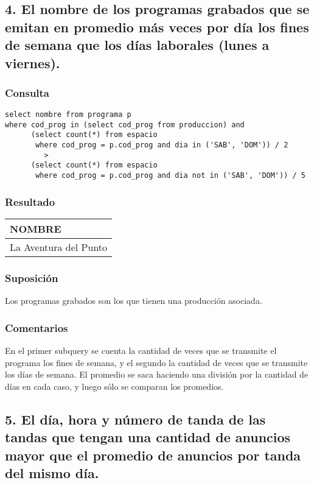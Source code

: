 \subsection*{4. \normalsize{El nombre de los programas grabados que se emitan en promedio m\'as veces por d\'ia los fines de semana que los d\'ias laborales (lunes a viernes).}}

\subsubsection*{Consulta}
\begin{lstlisting} 
select nombre from programa p
where cod_prog in (select cod_prog from produccion) and
      (select count(*) from espacio
       where cod_prog = p.cod_prog and dia in ('SAB', 'DOM')) / 2 
         >
      (select count(*) from espacio
       where cod_prog = p.cod_prog and dia not in ('SAB', 'DOM')) / 5
\end{lstlisting}

\subsubsection*{Resultado}
\begin{tabular}{|l|}
  \hline
    \bf{NOMBRE} \\ 
  \hline
    La Aventura del Punto \\ 
  \hline
\end{tabular} 


\subsubsection*{Suposici\'on}
Los programas grabados son los que tienen una producci\'on asociada. \\

\subsubsection*{Comentarios}
En el primer subquery se cuenta la cantidad de veces que se transmite el programa los fines de semana, y el segundo la cantidad de veces que se transmite los d\'ias de semana. El promedio se saca haciendo una divisi\'on por la cantidad de d\'ias en cada caso, y luego s\'olo se comparan los promedios.


\subsection*{5. \normalsize{El d\'ia, hora y n\'umero de tanda de las tandas que tengan una cantidad de anuncios mayor que el promedio de anuncios por tanda del mismo d\'ia.}}

